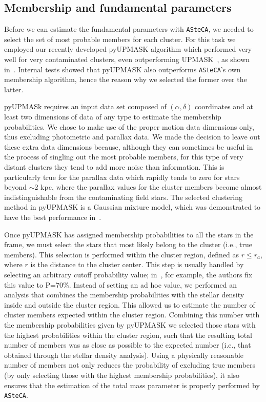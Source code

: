 \documentclass{aa}
\begin{document}
 \subsection{Membership and fundamental parameters}
  \label{ssec:fund_pars}

  Before we can estimate the fundamental parameters with \texttt{ASteCA}, we
  needed to select the set of most probable members for each cluster. For this
  task we employed our recently developed pyUPMASK algorithm which 
  performed very well for very contaminated clusters, even outperforming
  UPMASK~\citep{Krone2014}, as shown in~\cite{Pera_2021}. Internal tests
  showed that pyUPMASK also outperforms \texttt{ASteCA}'s own membership
  algorithm, hence the reason why we selected the former over the latter.

  pyUPMASk requires an input data set composed of $(\alpha, \delta)$ coordinates
  and at least two dimensions of data of any type to estimate the membership
  probabilities. We chose to make use of the proper motion data dimensions only,
  thus excluding photometric and parallax data.
  We made the decision to leave out these extra data dimensions because,
  although they can  sometimes be useful in the process of singling out the most
  probable members, for this type of very distant clusters they tend to add
  more noise than information.
  This is particularly true for the parallax data which
  rapidly tends to zero for stars beyond $\sim$2 kpc, where the parallax values
  for the cluster members become almost indistinguishable from the contaminating
  field stars. The selected clustering method in pyUPMASK is a Gaussian mixture
  model, which was demonstrated to have the best performance
  in~\citet[][see Sect. 4]{Pera_2021}.

  Once pyUPMASK has assigned membership probabilities to all the stars in the
  frame, we must select the  stars that most likely belong to the
  cluster (i.e., true members). This selection is performed within the
  cluster region, defined as $r\leq r_{a}$, where $r$ is the distance to the
  cluster center.
  This step is usually handled by selecting
  an arbitrary cutoff probability value; in~\cite{Cantat_2020}, for example,
  the authors fix this value to P=70\%. Instead of setting an ad hoc value, we
  performed an analysis that combines the membership probabilities with the
  stellar density inside and outside  the cluster region. This allowed us to
  estimate the number of cluster members expected within the cluster region.
  Combining this number with the membership probabilities given by pyUPMASK we
  selected those stars with the highest probabilities within the cluster region,
  such that the resulting total number of members was as close as possible to the
  expected number (i.e., that obtained through the stellar density analysis).
  Using a physically reasonable number of members not only reduces the
  probability of excluding true members (by only selecting those with the
  highest membership probabilities), it also ensures that the estimation of the
  total mass parameter is properly performed by \texttt{ASteCA}.\\
\end{document}
